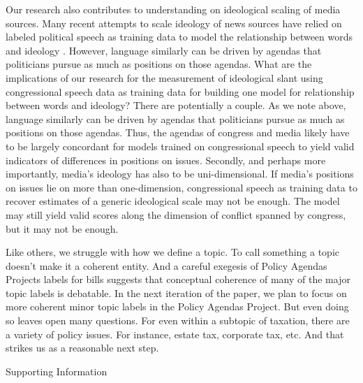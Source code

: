 \documentclass[12pt, letterpaper]{article}
\begin{document}
Our research also contributes to understanding on ideological scaling of media sources. Many recent attempts to scale ideology of news sources have relied on labeled political speech as training data to model the relationship between words and ideology \citep{groseclose2005, gentzkow2010}. However, language similarly can be driven by agendas that politicians pursue as much as positions on those agendas. What are the implications of our research for the measurement of ideological slant using congressional speech data as training data for building one model for relationship between words and ideology? There are potentially a couple. As we note above, language similarly can be driven by agendas that politicians pursue as much as positions on those agendas. Thus, the agendas of congress and media likely have to be largely concordant for models trained on congressional speech to yield valid indicators of differences in positions on issues. Secondly, and perhaps more importantly, media's ideology has also to be uni-dimensional. If media's positions on issues lie on more than one-dimension, congressional speech as training data to recover estimates of a generic ideological scale may not be enough. The model may still yield valid scores along the dimension of conflict spanned by congress, but it may not be enough.

Like others, we struggle with how we define a topic. To call something a topic doesn't make it a coherent entity. And a careful exegesis of Policy Agendas Projects labels for bills suggests that conceptual coherence of many of the major topic labels is debatable. In the next iteration of the paper, we plan to focus on more coherent minor topic labels in the Policy Agendas Project. But even doing so leaves open many questions. For even within a subtopic of taxation, there are a variety of policy issues. For instance, estate tax, corporate tax, etc. And that strikes us as a reasonable next step.

\clearpage




\clearpage
\appendix
\renewcommand{\thesection}{SI \arabic{section}}
\renewcommand\thetable{\thesection.\arabic{table}}  
\renewcommand\thefigure{\thesection.\arabic{figure}}


\begin{center}
\Large{Supporting Information}
\end{center}

\end{document}
